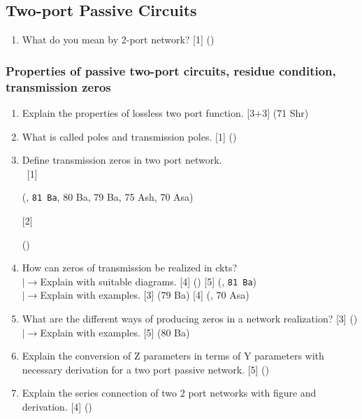 \documentclass[12pt]{article}
\newcommand{\lb}{\\$\left|\rightarrow\right.$}
\newcommand{\enter}{\\\textcolor{white}{1}}
\begin{document}
	\subsection{Two-port Passive Circuits}
		\begin{enumerate}[noitemsep, topsep=0pt]
			\item What do you mean by 2-port network? \hfill [1] () 
		\end{enumerate}

		\subsubsection{Properties of passive two-port circuits, residue condition, transmission zeros}
			\begin{enumerate}[noitemsep, topsep=0pt]
				\item Explain the properties of lossless two port function. \hfill [3+3] (71 Shr)

				\item What is called poles and transmission poles. \hfill [1] ()

				\item Define transmission zeros in two port network.
				\enter\hfill [1] \begin{footnotesize}(, \texttt{81 Ba}, 80 Ba, 79 Ba, 75 Ash, 70 Asa)\end{footnotesize} [2] \begin{footnotesize}()\end{footnotesize}
				
				\item How can zeros of transmission be realized in ckts?
				\lb Explain with suitable diagrams. \hfill [4] () [5] (, \texttt{81 Ba})
				\lb Explain with examples. \hfill [3] (79 Ba) [4] (, 70 Asa)
				
				\item What are the different ways of producing zeros in a network realization? \hfill [3] ()
				\lb Explain with examples. \hfill [5] (80 Ba)

				\item Explain the conversion of Z parameters in terms of Y parameters with necessary derivation for a two port passive network. \hfill [5] ()	
				
				\item Explain the series connection of two 2 port networks with figure and derivation. \hfill [4] ()
			\end{enumerate}
\end{document}
